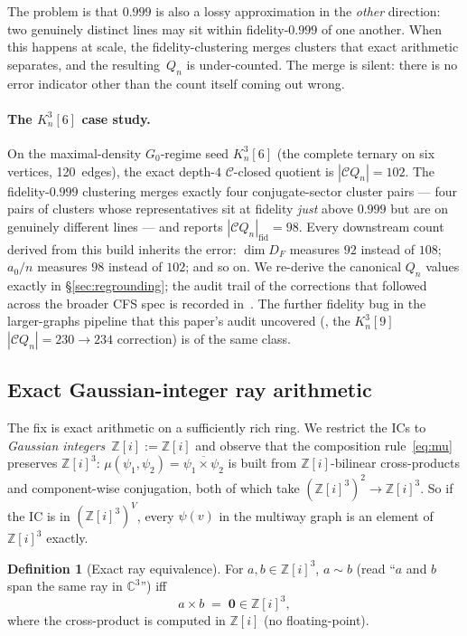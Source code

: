 \documentclass[12pt,a4paper]{article}
\theoremstyle{definition}
\newtheorem{definition}[theorem]{Definition}
\theoremstyle{remark}
\newcommand{\bZ}{\mathbb{Z}}
\newcommand{\bZi}{\mathbb{Z}[i]}            %
\newcommand{\bC}{\mathbb{C}}
\newcommand{\Kn}{K_n^3}
\newcommand{\Qn}{Q_n}
\newcommand{\Ccls}{\mathcal{C}}             %
\newcommand{\proj}{\mathrel{\sim}}          %
\begin{document}
The problem is that $0.999$ is also a lossy approximation in the
\emph{other} direction: two genuinely distinct lines may sit within
fidelity-$0.999$ of one another. When this happens at scale, the
fidelity-clustering merges clusters that exact arithmetic separates,
and the resulting~$\Qn$ is under-counted. The merge is silent: there
is no error indicator other than the count itself coming out wrong.

\paragraph{The $\Kn[6]$ case study.}
On the maximal-density $G_0$-regime seed $\Kn[6]$ (the complete
ternary on six vertices, 120~edges), the exact depth-$4$ $\Ccls$-closed
quotient is $|\Ccls\Qn| = 102$. The fidelity-$0.999$ clustering merges
exactly four conjugate-sector cluster pairs --- four pairs of clusters
whose representatives sit at fidelity \emph{just} above $0.999$ but are
on genuinely different lines --- and reports
$|\Ccls\Qn|_{\text{fid}} = 98$. Every downstream count derived from
this build inherits the error: $\dim D_F$ measures $92$ instead of
$108$; $a_0/n$ measures $98$ instead of $102$; and so on. We
re-derive the canonical $\Qn$ values exactly in
\S\ref{sec:regrounding}; the audit trail of the corrections that
followed across the broader CFS spec is recorded
in~\cite{closure-v5-audit-fidelity}. The further fidelity bug in the
larger-graphs pipeline that this paper's audit
uncovered (\cite{closure-v5-audit-threebug}, the $\Kn[9]$
$|\Ccls\Qn|=230 \to 234$ correction)
is of the same class.

\subsection{Exact Gaussian-integer ray arithmetic}
\label{sec:methods-exact}

The fix is exact arithmetic on a sufficiently rich ring. We restrict
the ICs to \emph{Gaussian integers}~$\bZi := \bZ[i]$ and observe that
the composition rule~\eqref{eq:mu} preserves $\bZi^3$:
$\mu(\psi_1, \psi_2) = \overline{\psi_1 \times \psi_2}$ is built from
$\bZi$-bilinear cross-products and component-wise conjugation, both of
which take $(\bZi^3)^2 \to \bZi^3$. So if the IC is in $(\bZi^3)^V$,
every $\psi(v)$ in the multiway graph is an element of $\bZi^3$
exactly.

\begin{definition}[Exact ray equivalence]\label{def:exact-equiv}
For $a, b \in \bZi^3$, $a \proj b$ (read ``$a$ and $b$ span the same
ray in $\bC^3$'') iff
\[
a \times b \;=\; \mathbf{0} \in \bZi^3,
\]
where the cross-product is computed in $\bZi$ (no floating-point).
\end{definition}
\end{document}
